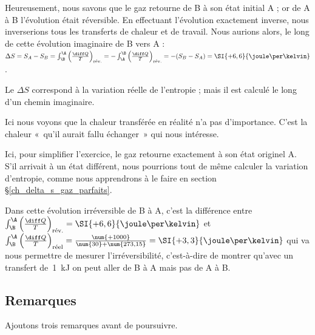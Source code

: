 \begin{anexample}
\begin{answer}
				Heureusement, nous savons que le gaz retourne de B à son état initial A ; or de A à B l’évolution était réversible. En effectuant l’évolution exactement inverse, nous inverserions tous les transferts de chaleur et de travail. Nous aurions alors, le long de cette évolution imaginaire de B vers A : $\Delta S = S_A - S_B
					= \int_\B^\A \left( \frac{\diff Q}{T} \right)_\text{rév.}
					= - \int_\A^\B \left( \frac{\diff Q}{T} \right)_\text{rév.}
					= -(S_B - S_A)
					= \SI{+6,6}{\joule\per\kelvin}$.
						\begin{remark}Le $\Delta S$ correspond à la variation réelle de l’entropie ; mais il est calculé le long d’un chemin imaginaire.\end{remark}
						\begin{remark} Ici nous voyons que la chaleur transférée en réalité n’a pas d’importance. C’est la chaleur «~qu’il aurait fallu échanger~» qui nous intéresse.\end{remark}
						\begin{remark} Ici, pour simplifier l’exercice, le gaz retourne exactement à son état originel A. S’il arrivait à un état différent, nous pourrions tout de même calculer la variation d’entropie, comme nous apprendrons à le faire en section \S\ref{ch_delta_s_gaz_parfaits}.\end{remark}
						\begin{remark}Dans cette évolution irréversible de B à A, c’est la différence entre $\int_\B^\A \left( \frac{\diff Q}{T} \right)_\text{rév.} = \SI{+6,6}{\joule\per\kelvin}$ et $\int_\B^\A \left( \frac{\diff Q}{T} \right)_\text{réel} = \frac{\num{+1000}}{\num{30}+\num{273,15}} =  \SI{+3,3}{\joule\per\kelvin}$ qui va nous permettre de mesurer l’irréversibilité, c’est-à-dire de montrer qu’avec un transfert de~\SI{1}{\kilo\joule} on peut aller de B à A mais pas de A à B.\end{remark}
				\end{answer}
		\end{anexample}

		
	\subsection{Remarques}
	
		Ajoutons trois remarques avant de poursuivre.
		
